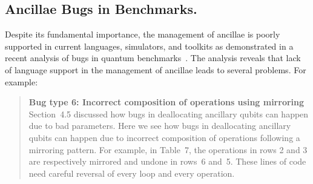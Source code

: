 \documentclass[sigplan,10pt,review,anonymous]{acmart}
\begin{document}
\subsection{Ancillae Bugs in Benchmarks.}
Despite its fundamental importance, the management of ancillae is
poorly supported in current languages, simulators, and toolkits as
demonstrated in a recent analysis of bugs in quantum
benchmarks~\cite{DBLP:conf/oopsla/HuangM18}. The analysis reveals that
lack of language support in the management of ancillae leads to
several problems. For example: 
\begin{quote}
  \textbf{Bug type 6: Incorrect composition of operations using mirroring}
  Section~4.5 discussed how bugs in deallocating ancillary qubits can
  happen due to bad parameters. Here we see how bugs in deallocating
  ancillary qubits can happen due to incorrect composition of
  operations following a mirroring pattern. For example, in Table~7,
  the operations in rows 2 and 3 are respectively mirrored and undone
  in rows~6 and~5. These lines of code need careful reversal of every
  loop and every operation.
\end{quote}
\end{document}
